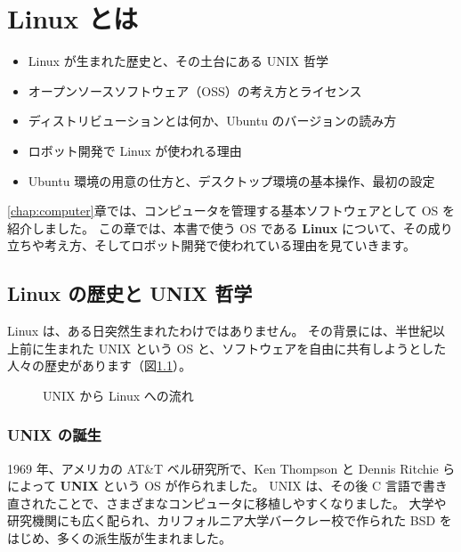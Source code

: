 \chapter{Linux とは}
\label{chap:what_is_linux}

\begin{goalbox}
  \begin{itemize}
    \item Linux が生まれた歴史と、その土台にある UNIX 哲学
    \item オープンソースソフトウェア（OSS）の考え方とライセンス
    \item ディストリビューションとは何か、Ubuntu のバージョンの読み方
    \item ロボット開発で Linux が使われる理由
    \item Ubuntu 環境の用意の仕方と、デスクトップ環境の基本操作、最初の設定
  \end{itemize}
\end{goalbox}

\ref{chap:computer}章では、コンピュータを管理する基本ソフトウェアとして OS を紹介しました。
この章では、本書で使う OS である \textbf{Linux} について、その成り立ちや考え方、そしてロボット開発で使われている理由を見ていきます。

\section{Linux の歴史と UNIX 哲学}
\label{sec:linux-history}

Linux は、ある日突然生まれたわけではありません。
その背景には、半世紀以上前に生まれた UNIX という OS と、ソフトウェアを自由に共有しようとした人々の歴史があります（図\ref{fig:linux-history}）。

\begin{figure}[tb]
  \centering
  
  \caption{UNIX から Linux への流れ}
  \label{fig:linux-history}
\end{figure}

\subsection{UNIX の誕生}

1969 年、アメリカの AT\&T ベル研究所で、Ken Thompson と Dennis Ritchie らによって \textbf{UNIX} という OS が作られました。
UNIX は、その後 C 言語で書き直されたことで、さまざまなコンピュータに移植しやすくなりました。
大学や研究機関にも広く配られ、カリフォルニア大学バークレー校で作られた BSD をはじめ、多くの派生版が生まれました。

